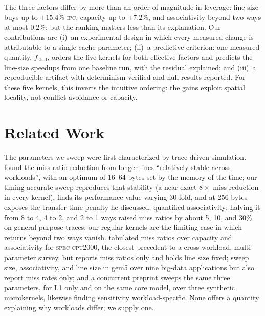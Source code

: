 \documentclass[12pt]{article}
\begin{document}
The three factors differ by more than an order of magnitude in leverage: line
size buys up to \(+15.4\%\) \textsc{ipc}, capacity up to \(+7.2\%\), and
associativity beyond two ways at most \(0.2\%\); but the ranking matters less
than its explanation. Our contributions are (i)~an experimental design in which
every measured change is attributable to a single cache parameter; (ii)~a
predictive criterion: one measured quantity, \(f_{\text{stall}}\), orders the
five kernels for both effective factors and predicts the line-size speedups from
one baseline run, with the residual explained; and (iii)~a reproducible artifact
with determinism verified and null results reported. For these five kernels,
this inverts the intuitive ordering: the gains exploit spatial locality, not
conflict avoidance or capacity.

\section{Related Work}\label{sec:related}

The parameters we sweep were first characterized by trace-driven simulation.
\cite{smith:1987} found the miss-ratio reduction from longer lines
\enquote{relatively stable across workloads}, with an optimum of 16--64 bytes set
by the memory of the time; our timing-accurate sweep reproduces that stability
(a near-exact \(8\times\) miss reduction in every kernel), finds its performance
value varying 30-fold, and at 256 bytes exposes the transfer-time penalty he
discussed. \cite{hill:1989} quantified
associativity: halving it from 8 to 4, 4 to 2, and 2 to 1 ways raised miss
ratios by about 5, 10, and 30\% on general-purpose traces; our regular kernels
are the limiting case in which returns beyond two ways vanish. \cite{cantin:2001} tabulated miss ratios over capacity and
associativity for \textsc{spec cpu2000}, the closest precedent to a
cross-workload, multi-parameter survey, but reports miss ratios only and holds
line size fixed; \cite{dave:2024} sweep size, associativity, and line size in
gem5 over nine big-data applications but also report miss rates only; and a
concurrent preprint \cite{saha:2026} sweeps the same three parameters, for L1
only and on the same core model, over three synthetic microkernels, likewise
finding sensitivity workload-specific. None offers a quantity explaining why
workloads differ; we supply one.
\end{document}
